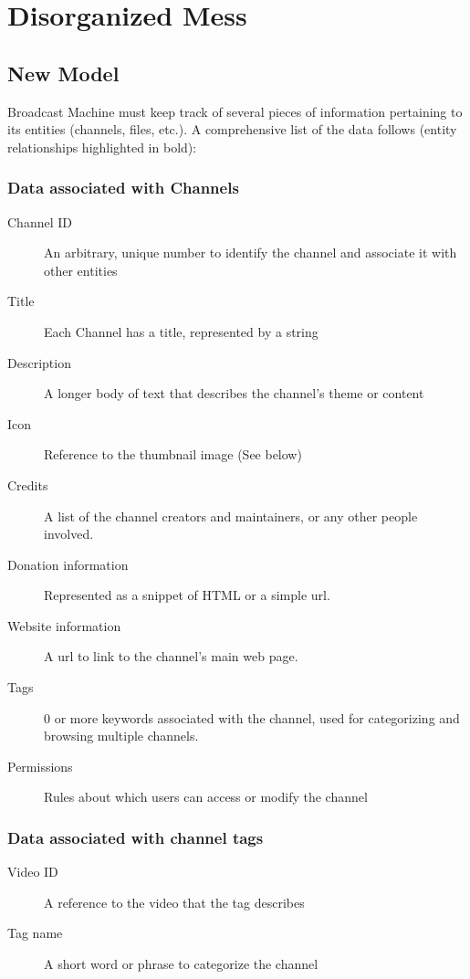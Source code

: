 \documentclass[a4paper,12pt]{report}
\begin{document}
\chapter{Disorganized Mess}
\section{New Model}
Broadcast Machine must keep track of several pieces of information pertaining to its entities (channels, files, etc.).
A comprehensive list of the data follows (entity relationships highlighted in bold):


\subsection{Data associated with Channels}
\begin{description}
\item[Channel ID] An arbitrary, unique number to identify the channel and  associate it with other entities
\item[Title] Each Channel has a title, represented by a string
\item[Description] A longer body of text that describes the channel's theme or content
\item[Icon] Reference to the thumbnail image (See below)
\item[Credits] A list of the channel creators and maintainers, or any other people involved.
\item[Donation information] Represented as a snippet of HTML or a simple url.
\item[Website information] A url to link to the channel's main web page.
\item[Tags] 0 or more keywords associated with the channel, used for categorizing and browsing multiple channels.
\item[Permissions] Rules about which users can access or modify the channel
\end{description}

\subsection{Data associated with channel tags}
\begin{description}
\item[Video ID] A reference to the video that the tag describes
\item[Tag name] A short word or phrase to categorize the channel
\end{description}
\end{document}
